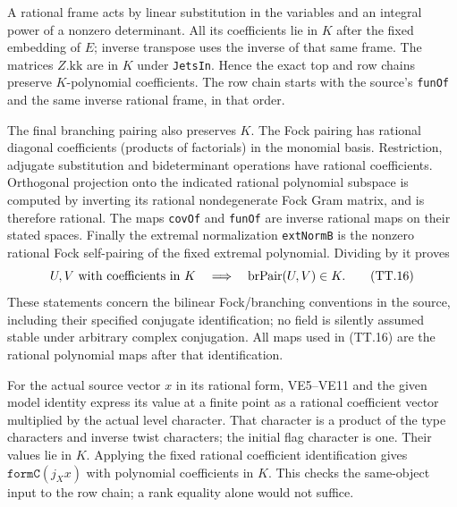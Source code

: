 A rational frame acts by linear substitution in the variables and
an integral power of a nonzero determinant. All its coefficients
lie in $K$ after the fixed embedding of $E$; inverse transpose
uses the inverse of that same frame. The matrices $Z.\mathrm{kk}$
are in $K$ under \texttt{JetsIn}. Hence the exact top and row
chains preserve $K$-polynomial coefficients. The row chain starts
with the source's \texttt{funOf} and the same inverse rational
frame, in that order.

The final branching pairing also preserves $K$. The Fock pairing
has rational diagonal coefficients (products of factorials) in
the monomial basis. Restriction, adjugate substitution and
bideterminant operations have rational coefficients. Orthogonal
projection onto the indicated rational polynomial subspace is
computed by inverting its rational nondegenerate Fock Gram
matrix, and is therefore rational. The maps \texttt{covOf} and
\texttt{funOf} are inverse rational maps on their stated spaces.
Finally the extremal normalization \texttt{extNormB} is the
nonzero rational Fock self-pairing of the fixed extremal
polynomial. Dividing by it proves
\[
       U,V\hbox{ with coefficients in }K
       \quad\Longrightarrow\quad\operatorname{brPair}(U,V)\in K.
                                                                  \tag{TT.16}
\]
These statements concern the bilinear Fock/branching conventions
in the source, including their specified conjugate identification;
no field is silently assumed stable under arbitrary complex
conjugation. All maps used in (TT.16) are the rational polynomial
maps after that identification.

For the actual source vector $x$ in its rational form, VE5--VE11
and the given model identity express its value at a finite point
as a rational coefficient vector multiplied by the actual level
character. That character is a product of the type characters and
inverse twist characters; the initial flag character is one.
Their values lie in $K$. Applying the fixed rational coefficient
identification gives $\texttt{formC}(j_X x)$ with polynomial
coefficients in $K$. This checks the same-object input to the row
chain; a rank equality alone would not suffice.

